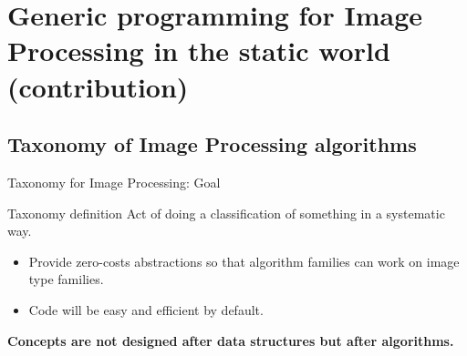 \documentclass[12pt,aspectratio=169]{beamer}
\begin{document}
%
%
%
\section[Generic Programming for Image Processing in the static world (contribution)]{Generic programming for Image Processing in the static world (contribution)}

\subsection{Taxonomy of Image Processing algorithms}

\begin{frame}{Taxonomy for Image Processing: Goal}
  \begin{alertblock}{Taxonomy definition}
    \vspace{0.2cm}
    Act of doing a classification of something in a systematic way.
  \end{alertblock}
  \begin{itemize}
    \item Provide zero-costs abstractions so that algorithm families can work on image type families.
    \item Code will be easy and efficient by default.
  \end{itemize}
  \begin{center}
    \textbf{Concepts are not designed after data structures but after algorithms.}
  \end{center}
\end{frame}
\end{document}
